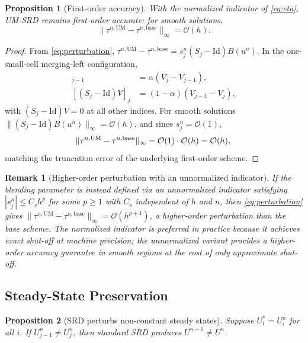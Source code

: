 \documentclass[11pt]{article}
\newtheorem{remark}{Remark}
\newtheorem{proposition}{Proposition}
\begin{document}
\begin{proposition}[First-order accuracy]
\label{prop:local-consistency}
With the normalized indicator of \eqref{eq:eta}, UM-SRD remains first-order 
accurate: for smooth solutions,
\[
  \|\tau^{n,\mathrm{UM}} - \tau^{n,\mathrm{base}}\|_\infty = \mathcal{O}(h).
\]
\end{proposition}

\begin{proof}
From \eqref{eq:perturbation}, $\tau^{n,\mathrm{UM}} - \tau^{n,\mathrm{base}} 
= s_j^n (S_j - \mathrm{Id}) B(u^n)$. In the one-small-cell merging-left 
configuration,
\begin{align*}
  [(S_j - \mathrm{Id})V]_{j-1} &= \alpha(V_j - V_{j-1}), \\
  [(S_j - \mathrm{Id})V]_j     &= (1-\alpha)(V_{j-1} - V_j),
\end{align*}
with $(S_j - \mathrm{Id})V = 0$ at all other indices. For smooth solutions 
$\|(S_j - \mathrm{Id})B(u^n)\|_\infty = \mathcal{O}(h)$, and since 
$s_j^n = \mathcal{O}(1)$,
\[
  \|\tau^{n,\mathrm{UM}} - \tau^{n,\mathrm{base}}\|_\infty
  = \mathcal{O}(1) \cdot \mathcal{O}(h) = \mathcal{O}(h), \qedhere
\]
matching the truncation error of the underlying first-order scheme.
\end{proof}

\begin{remark}[Higher-order perturbation with an unnormalized indicator]
\label{rem:unnormalized}
If the blending parameter is instead defined via an unnormalized indicator 
satisfying $|s_j^n| \le C_s h^p$ for some $p \ge 1$ with $C_s$ independent 
of $h$ and $n$, then \eqref{eq:perturbation} gives 
$\|\tau^{n,\mathrm{UM}} - \tau^{n,\mathrm{base}}\|_\infty = \mathcal{O}(h^{p+1})$,
a higher-order perturbation than the base scheme. The normalized indicator 
is preferred in practice because it achieves exact shut-off at machine 
precision; the unnormalized variant provides a higher-order accuracy guarantee 
in smooth regions at the cost of only approximate shut-off.
\end{remark}

\subsection{Steady-State Preservation}
\label{sec:steady-state}

\begin{proposition}[SRD perturbs non-constant steady states]
\label{prop:srd-steady}
Suppose $U_i^* = U_i^n$ for all $i$. If $U_{j-1}^n \ne U_j^n$, then 
standard SRD produces $U^{n+1} \ne U^n$.
\end{proposition}
\end{document}
